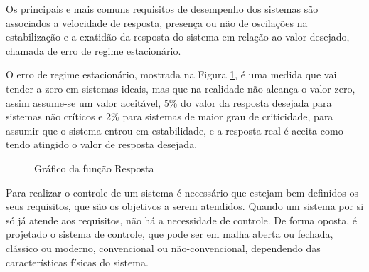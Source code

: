 Os principais e mais comuns requisitos de desempenho dos sistemas são associados a velocidade de resposta, 
presença ou não de oscilações na estabilização e 
a exatidão da resposta do sistema em relação ao valor desejado, 
chamada de erro de regime estacionário.


O erro de regime estacionário, mostrada na Figura \ref{fig:funcaoResposta}, 
é uma medida que vai tender a zero em sistemas ideais, 
mas que na realidade não alcança o valor zero, 
assim assume-se um valor aceitável, 
5\% do valor da resposta desejada para sistemas não críticos e 
2\% para sistemas de maior grau de criticidade, 
para assumir que o sistema entrou em estabilidade, 
e a resposta real é aceita como tendo atingido o valor de resposta desejada. 



\begin{figure}[!htb]
\centering
{} 
\caption{Gráfico da função Resposta}
\label{fig:funcaoResposta}
\end{figure}




Para realizar o controle de um sistema é necessário que estejam bem definidos os seus requisitos, 
que são os objetivos a serem atendidos. 
Quando um sistema por si só já atende aos requisitos, 
não há a necessidade de controle. 
De forma oposta, é projetado o sistema de controle, 
que pode ser em malha aberta ou fechada, 
clássico ou moderno, convencional ou não-convencional, 
dependendo das características físicas do sistema. 


